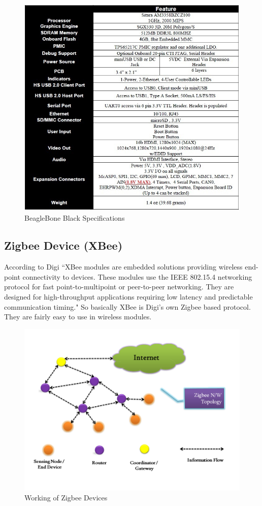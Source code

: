 \documentclass[10pt,a4paper]{article}
\begin{document}
\begin{figure}[hbtp]
\centering
\includegraphics[scale=0.78]{Features.jpg}
\caption{BeagleBone Black Specifications}
\end{figure}

\subsection{ Zigbee Device (XBee)}

\quad
According to Digi ``XBee modules are embedded solutions providing wireless end-point connectivity to devices. These modules use the IEEE 802.15.4 networking protocol for fast point-to-multipoint or peer-to-peer networking. They are designed for high-throughput applications requiring low latency and predictable communication timing." So basically XBee is Digi's own Zigbee based protocol. They are fairly easy to use in wireless modules. \cite{10}

\begin{figure}[hbtp]
\centering
\includegraphics[scale=0.5]{present.png}
\caption{Working of Zigbee Devices}
\end{figure}
\end{document}
